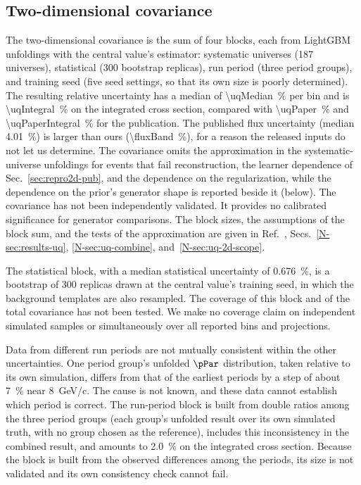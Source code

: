 \subsection{Two-dimensional covariance}
\label{sec:uq2d}

The two-dimensional covariance is the sum of four blocks, each from LightGBM unfoldings with the central value's
estimator: systematic universes (187 universes), statistical (300 bootstrap replicas), run period (three period
groups), and training seed (five seed settings, so that its own size is poorly determined).
The resulting relative uncertainty has a median of \SI{\uqMedian}{\percent} per bin and is
\SI{\uqIntegral}{\percent} on the integrated cross section, compared with \SI{\uqPaper}{\percent} and \SI{\uqPaperIntegral}{\percent} for the
publication.
The published flux uncertainty (median \SI{4.01}{\percent}) is larger than ours (\SI{\fluxBand}{\percent}), for a
reason the released inputs do not let us determine.
The covariance omits the approximation in the systematic-universe unfoldings for events that fail reconstruction,
the learner dependence of Sec.~\ref{sec:repro2d-pub}, and the dependence on the regularization, while the
dependence on the prior's generator shape is reported beside it (below).
The covariance has not been independently validated.
It provides no calibrated significance for generator comparisons.
The block sizes, the assumptions of the block sum, and the tests of the approximation are given in
Ref.~\cite{AnalysisNote2026}, Secs.~\ref*{N-sec:results-uq}, \ref*{N-sec:uq-combine}, and~\ref*{N-sec:uq-2d-scope}.

The statistical block, with a median statistical uncertainty of \SI{0.676}{\percent}, is a bootstrap of 300
replicas drawn at the central value's training seed, in which the background templates are also resampled.
The coverage of this block and of the total covariance has not been tested.
We make no coverage claim on independent simulated samples or simultaneously over all reported bins and
projections.

Data from different run periods are not mutually consistent within the other uncertainties.
One period group's unfolded $\pPar$ distribution, taken relative to its own simulation, differs from that of the
earliest periods by a step of about \SI{7}{\percent} near \SI{8}{GeV/c}.
The cause is not known, and these data cannot establish which period is correct.
The run-period block is built from double ratios among the three period groups (each group's unfolded result over
its own simulated truth, with no group chosen as the reference), includes this inconsistency in the combined result, and amounts to
\SI{2.0}{\percent} on the integrated cross section.
Because the block is built from the observed differences among the periods, its size is not validated and its own
consistency check cannot fail.


